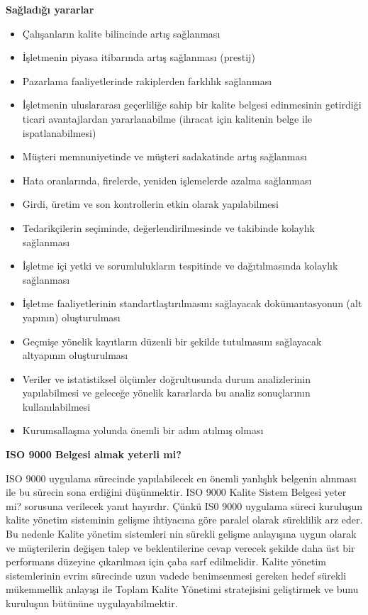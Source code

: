 \documentclass[
]{book}
\providecommand{\tightlist}{%
  \setlength{\itemsep}{0pt}\setlength{\parskip}{0pt}}
\begin{document}
\textbf{Sağladığı yararlar}

\begin{itemize}
\tightlist
\item
  Çalışanların kalite bilincinde artış sağlanması
\item
  İşletmenin piyasa itibarında artış sağlanması (prestij)
\item
  Pazarlama faaliyetlerinde rakiplerden farklılık sağlanması
\item
  İşletmenin uluslararası geçerliliğe sahip bir kalite belgesi edinmesinin getirdiği ticari avantajlardan yararlanabilme (ihracat için kalitenin belge ile ispatlanabilmesi)
\item
  Müşteri memnuniyetinde ve müşteri sadakatinde artış sağlanması
\item
  Hata oranlarında, firelerde, yeniden işlemelerde azalma sağlanması
\item
  Girdi, üretim ve son kontrollerin etkin olarak yapılabilmesi
\item
  Tedarikçilerin seçiminde, değerlendirilmesinde ve takibinde kolaylık sağlanması
\item
  İşletme içi yetki ve sorumlulukların tespitinde ve dağıtılmasında kolaylık sağlanması
\item
  İşletme faaliyetlerinin standartlaştırılmasını sağlayacak dokümantasyonun (alt yapının) oluşturulması
\item
  Geçmişe yönelik kayıtların düzenli bir şekilde tutulmasını sağlayacak altyapının oluşturulması
\item
  Veriler ve istatistiksel ölçümler doğrultusunda durum analizlerinin yapılabilmesi ve geleceğe yönelik kararlarda bu analiz sonuçlarının kullanılabilmesi
\item
  Kurumsallaşma yolunda önemli bir adım atılmış olması
\end{itemize}

\textbf{ISO 9000 Belgesi almak yeterli mi?}

ISO 9000 uygulama sürecinde yapılabilecek en önemli yanlışlık belgenin alınması ile bu sürecin sona erdiğini düşünmektir. ISO 9000 Kalite Sistem Belgesi yeter mi? sorusuna verilecek yanıt hayırdır. Çünkü IS0 9000 uygulama süreci kuruluşun kalite yönetim sisteminin gelişme ihtiyacına göre paralel olarak süreklilik arz eder. Bu nedenle Kalite yönetim sistemleri nin sürekli gelişme anlayışına uygun olarak ve müşterilerin değişen talep ve beklentilerine cevap verecek şekilde daha üst bir performans düzeyine çıkarılması için çaba sarf edilmelidir. Kalite yönetim sistemlerinin evrim sürecinde uzun vadede benimsenmesi gereken hedef sürekli mükemmellik anlayışı ile Toplam Kalite Yönetimi stratejisini geliştirmek ve bunu kuruluşun bütününe uygulayabilmektir.
\end{document}
